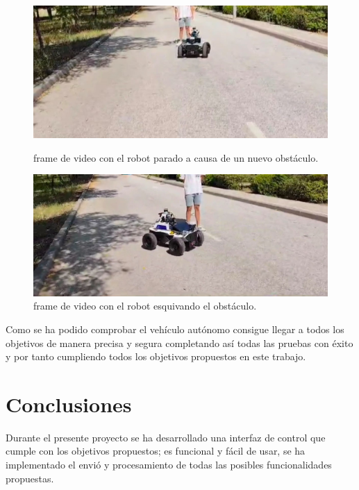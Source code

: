 \begin{figure}[htbp]
  \centering
  \begin{minipage}[b]{0.45\textwidth}
    \centering
    \includegraphics[width=\textwidth]{images/evitacion_video_inicio.jpeg}
    \caption{frame de video con el robot parado a causa de un nuevo obstáculo.}
    \label{fig:frame1_dinamica}
  \end{minipage}
  \hfill
  \begin{minipage}[b]{0.45\textwidth}
    \centering
    \includegraphics[width=\textwidth]{images/evitacion_video_final.jpeg}
    \caption{frame de video con el robot esquivando el obstáculo.}
    \label{fig:frame2_dinamica}
  \end{minipage}
\end{figure}

Como se ha podido comprobar el vehículo autónomo consigue llegar a todos los objetivos de manera precisa y segura completando así todas las pruebas con éxito y por tanto 
cumpliendo todos los objetivos propuestos en este trabajo.

\chapter{Conclusiones}
Durante el presente proyecto se ha desarrollado una interfaz de control que cumple con los objetivos propuestos; es funcional y fácil de usar, 
se ha implementado el envió y procesamiento de todas las posibles funcionalidades propuestas.

